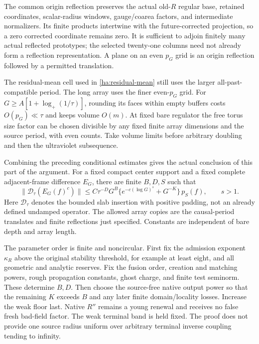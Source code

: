 The common origin reflection preserves the actual old-$R$ regular base,
retained coordinates, scalar-radius windows, gauge/coarea factors, and
intermediate normalizers.  Its finite products intertwine with the
future-corrected projection, so a zero corrected coordinate remains zero.
It is sufficient to adjoin finitely many actual reflected prototypes;
the selected twenty-one columns need not already form a reflection
representation.  A plane on an even $p_G$ grid is an origin reflection
followed by a permitted translation.

The residual-mean cell used in \eqref{ha:residual-mean} still uses the
larger all-past-compatible period.  The long array uses the finer
even-$p_G$ grid.  For
$G\geq A[1+\log_+(1/\tau)]$, rounding its faces within empty buffers
costs $O(p_G)\ll\tau$ and keeps volume $O(m)$.  At fixed bare regulator
the free torus size factor can be chosen divisible by any fixed finite
array dimensions and the source period, with even counts.  Take volume
limits before arbitrary doubling and then the ultraviolet subsequence.

Combining the preceding conditional estimates gives the actual conclusion
of this part of the argument.  For a fixed compact center support and a
fixed complete adjacent-frame difference $E_G$, there are finite
$B,D,S$ such that
\begin{equation}
 \|\mathcal D_\tau(E_G(f)^c)\|
 \leq C\tau^{-D}G^B
       \{e^{-c(\log G)^s}+G^{-K}\}\,p_S(f),\qquad s>1.
 \label{ha:copied-estimate}
\end{equation}
Here $\mathcal D_\tau$ denotes the bounded slab insertion with positive
padding, not an already defined undamped operator.  The allowed array
copies are the causal-period translates and finite reflections just
specified.  Constants are independent of bare depth and array length.

The parameter order is finite and noncircular.  First fix the admission
exponent $\kappa_R$ above the original stability threshold, for example
at least eight, and all geometric and analytic reserves.  Fix the fusion
order, creation and matching powers, rough propagation constants, ghost
charge, and finite test seminorm.  These determine $B,D$.  Then choose
the source-free native output power so that the remaining $K$ exceeds
$B$ and any later finite domain/locality losses.  Increase the weak
floor last.  Native $R''$ remains a young renewal and receives no false
fresh bad-field factor.  The weak terminal band is held fixed.  The
proof does not provide one source radius uniform over arbitrary terminal
inverse coupling tending to infinity.

